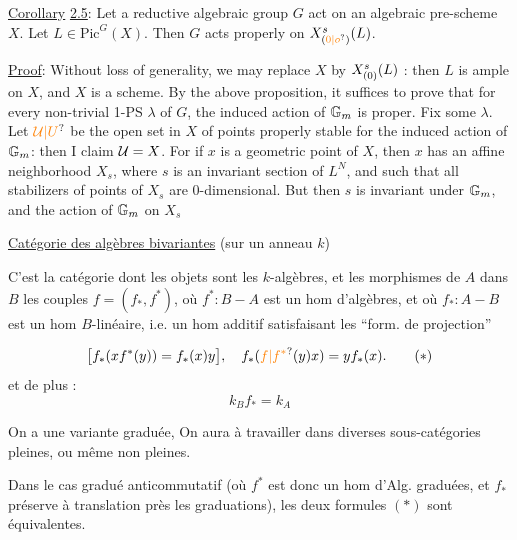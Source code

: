 \uline{Corollary} \uline{2.5}: Let a reductive algebraic group $G$ act on an algebraic pre-scheme $X$. Let $L\in\mathrm{Pic}^{G}(X)$. Then $G$ acts properly on $X^s_{\handwritten{(\unsure{0|o})}}(L)$.

\uline{Proof}: Without loss of generality, we may replace $X$ by $X^s_{(0)}(L)$ : then $L$ is ample on $X$, and $X$ is a scheme. By the above proposition, it suffices to prove that for every non-trivial 1-PS $\lambda$ of $G$, the induced action of $\mathbb G_m$ is proper. Fix some $\lambda$. Let $\handwritten{\unsure{\mathcal U|U}}$ be the open set in $X$ of points properly stable for the induced action of $\mathbb G_m$: then I claim $\mathcal U=X$. For if $x$ is a geometric point of $X$, then $x$ has an affine neighborhood $X_s$, where $s$ is an invariant section of $L^N$, and such that all stabilizers of points of $X_s$ are 0-dimensional. But then $s$ is invariant under $\mathbb G_m$, and the action of $\mathbb G_m$ on $X_s$

\uline{Catégorie des algèbres bivariantes} (sur un anneau $k$)

C'est la catégorie dont les objets sont les $k$-algèbres, et les morphismes de $A$ dans $B$ les couples $f=(f_*,f^*)$, où $f^*:B-A$ est un hom d'algèbres, et où $f_*:A-B$ est un hom $B$-linéaire, i.e. un hom additif satisfaisant les ``form. de projection''

\[
\bigl[f_*(x f^*(y))=f_*(x)y\bigr],\quad f_*(\unsure{f|f^*}(y)x)=y f_*(x). \tag*{$(\ast)$}
\]
et de plus :
\[
k_B f_*=k_A \tag*{$(\ast\ast)$}
\]

On a une variante graduée,  On aura à travailler dans diverses sous-catégories pleines, ou même non pleines.

Dans le cas gradué anticommutatif (où $f^*$ est donc un hom d'Alg. graduées, et  $f_*$ préserve à translation près  les graduations), les deux formules $(\ast)$ sont équivalentes.

